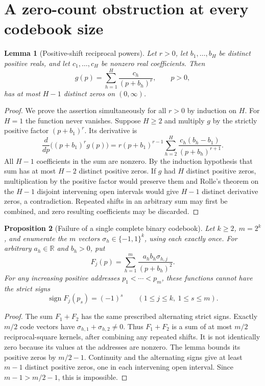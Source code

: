 \documentclass[11pt]{article}
\newtheorem{proposition}{Proposition}
\newtheorem{lemma}[proposition]{Lemma}
\begin{document}
\section{A zero-count obstruction at every codebook size}

\begin{lemma}[Positive-shift reciprocal powers]
Let $r>0$, let $b_1,\ldots,b_H$ be distinct positive reals, and let
$c_1,\ldots,c_H$ be nonzero real coefficients. Then
\[
 g(p)=\sum_{h=1}^H \frac{c_h}{(p+b_h)^r},\qquad p>0,
\]
has at most $H-1$ distinct zeros on $(0,\infty)$.
\end{lemma}
\begin{proof}
We prove the assertion simultaneously for all $r>0$ by induction on
$H$. For $H=1$ the function never vanishes. Suppose $H\geq2$ and
multiply $g$ by the strictly positive factor $(p+b_1)^r$. Its
derivative is
\[
 \frac{d}{dp}\big((p+b_1)^r g(p)\big)
 =r(p+b_1)^{r-1}
   \sum_{h=2}^H\frac{c_h(b_h-b_1)}{(p+b_h)^{r+1}}.
\]
All $H-1$ coefficients in the sum are nonzero. By the induction
hypothesis that sum has at most $H-2$ distinct positive zeros.
If $g$ had $H$ distinct positive zeros, multiplication by the positive
factor would preserve them and Rolle's theorem on the $H-1$ disjoint
intervening open intervals would give $H-1$ distinct derivative zeros,
a contradiction. Repeated shifts in an arbitrary sum may first be
combined, and zero resulting coefficients may be discarded.
\end{proof}

\begin{proposition}[Failure of a single complete binary codebook]
Let $k\geq2$, $m=2^k$, and enumerate the $m$ vectors
$\sigma_h\in\{-1,1\}^k$, using each exactly once. For arbitrary
$a_h\in\mathbb R$ and $b_h>0$, put
\[
 F_j(p)=\sum_{h=1}^m
       \frac{a_h b_h\sigma_{h,j}}{(p+b_h)^2}.
\]
For any increasing positive addresses $p_1<\cdots<p_m$, these
functions cannot have the strict signs
\[
 \operatorname{sign}F_j(p_s)=(-1)^s
 \qquad(1\leq j\leq k,\ 1\leq s\leq m).
\]
\end{proposition}
\begin{proof}
The sum $F_1+F_2$ has the same prescribed alternating strict signs.
Exactly $m/2$ code vectors have $\sigma_{h,1}+\sigma_{h,2}\neq0$.
Thus $F_1+F_2$ is a sum of at most $m/2$ reciprocal-square kernels,
after combining any repeated shifts. It is not identically zero
because its values at the addresses are nonzero. The lemma bounds
its positive zeros by $m/2-1$. Continuity and the alternating signs
give at least $m-1$ distinct positive zeros, one in each intervening
open interval. Since $m-1>m/2-1$, this is impossible.
\end{proof}
\end{document}
